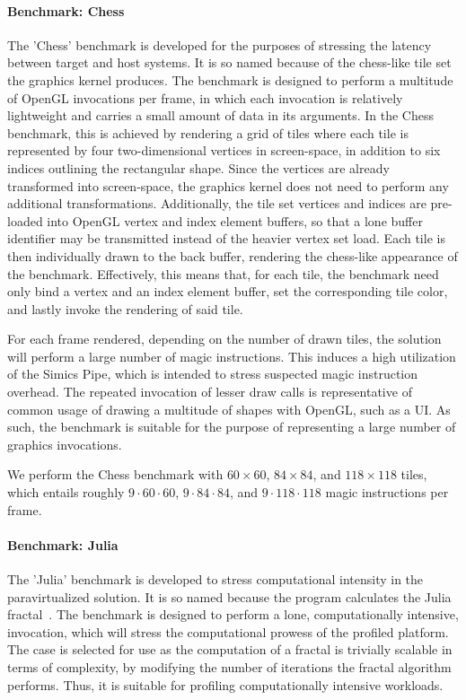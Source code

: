 \paragraph{Benchmark: Chess}
\label{par:experimentalmethodology_benchmarking_benchmarkchess}
The 'Chess' benchmark is developed for the purposes of stressing the latency between target and host systems.
It is so named because of the chess-like tile set the graphics kernel produces.
The benchmark is designed to perform a multitude of OpenGL invocations per frame, in which each invocation is relatively lightweight and carries a small amount of data in its arguments.
In the Chess benchmark, this is achieved by rendering a grid of tiles where each tile is represented by four two-dimensional vertices in screen-space, in addition to six indices outlining the rectangular shape.
Since the vertices are already transformed into screen-space, the graphics kernel does not need to perform any additional transformations.
Additionally, the tile set vertices and indices are pre-loaded into OpenGL vertex and index element buffers, so that a lone buffer identifier may be transmitted instead of the heavier vertex set load.
Each tile is then individually drawn to the back buffer, rendering the chess-like appearance of the benchmark.
Effectively, this means that, for each tile, the benchmark need only bind a vertex and an index element buffer, set the corresponding tile color, and lastly invoke the rendering of said tile.

For each frame rendered, depending on the number of drawn tiles, the solution will perform a large number of magic instructions.
This induces a high utilization of the Simics Pipe, which is intended to stress suspected magic instruction overhead.
The repeated invocation of lesser draw calls is representative of common usage of drawing a multitude of shapes with OpenGL, such as a UI.
As such, the benchmark is suitable for the purpose of representing a large number of graphics invocations.

We perform the Chess benchmark with $60\times60$, $84\times84$, and $118\times118$ tiles, which entails roughly $9\cdot60\cdot60$, $9\cdot84\cdot84$, and $9\cdot118\cdot118$ magic instructions per frame.

\paragraph{Benchmark: Julia}
\label{par:experimentalmethodology_benchmarking_benchmarkjulia}
The 'Julia' benchmark is developed to stress computational intensity in the paravirtualized solution.
It is so named because the program calculates the Julia fractal~.
The benchmark is designed to perform a lone, computationally intensive, invocation, which will stress the computational prowess of the profiled platform.
The case is selected for use as the computation of a fractal is trivially scalable in terms of complexity, by modifying the number of iterations the fractal algorithm performs.
Thus, it is suitable for profiling computationally intensive workloads.

